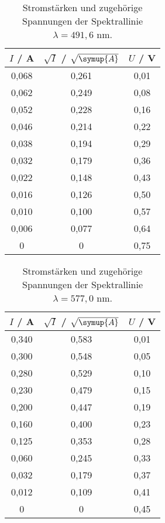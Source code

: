 \begin{table}[!htp]
    \centering
    \caption{Stromstärken und zugehörige Spannungen der Spektrallinie $\lambda = 491,6$ nm.} 
    \label{tab:tabelle1}
        \begin{tabular}{c c c}
        
            \toprule
            { $I$ / A} & {$\sqrt{I}$ / $\sqrt{\symup{A}}$} & {$U$ / V} \\
            \midrule
                0,068 & 0,261 & 0,01 \\
                0,062 & 0,249 & 0,08 \\
                0,052 & 0,228 & 0,16 \\
                0,046 & 0,214 & 0,22 \\
                0,038 & 0,194 & 0,29 \\
                0,032 & 0,179 & 0,36 \\
                0,022 & 0,148 & 0,43 \\
                0,016 & 0,126 & 0,50 \\
                0,010 & 0,100 & 0,57 \\
                0,006 & 0,077 & 0,64 \\
                0     & 0 & 0,75 \\
            \bottomrule
        \end{tabular}
        
\end{table}
\begin{table}   
\centering 
 \caption{Stromstärken und zugehörige Spannungen der Spektrallinie $\lambda = 577,0$ nm.} 
        \begin{tabular}{c c c}
            \toprule
            { $I$ / A} & {$\sqrt{I}$ / $\sqrt{\symup{A}}$} & {$U$ / V} \\
            \midrule
               0,340 & 0,583 & 0,01 \\
               0,300 & 0,548 & 0,05 \\
               0,280 & 0,529 & 0,10 \\
               0,230 & 0,479 & 0,15 \\
               0,200 & 0,447 & 0,19 \\
               0,160 & 0,400 & 0,23 \\
               0,125 & 0,353 & 0,28 \\
               0,060 & 0,245 & 0,33 \\
               0,032 & 0,179 & 0,37 \\
               0,012 & 0,109 & 0,41 \\
               0     & 0 & 0,45 \\ 
            \bottomrule
        \end{tabular}
       
\end{table}
